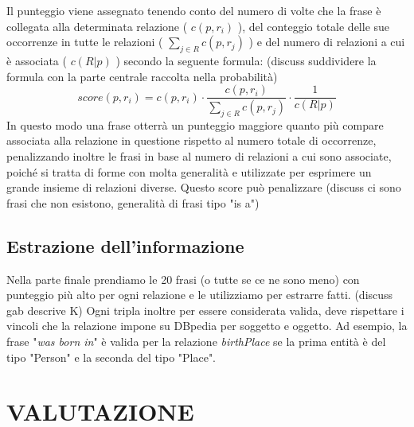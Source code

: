 \documentclass[10pt,a4paper,twocolumn]{article}
\begin{document}
Il punteggio viene assegnato tenendo conto del numero di volte che la frase è collegata alla determinata relazione ( $c(p,r_i)$ ), del conteggio totale delle sue occorrenze in tutte le relazioni ( $\sum_{j \in R} c(p,r_j)$ ) e del numero di relazioni a cui è associata ( $c(R|p)$ ) secondo la seguente formula: (discuss suddividere la formula con la parte centrale raccolta nella probabilità)
\[score(p,r_i)=c(p,r_i)\cdot\frac{c(p,r_i)}{\sum_{j \in R}c(p,r_j)}\cdot \frac{1}{c(R|p)} \]
In questo modo una frase otterrà un punteggio maggiore quanto più compare associata alla relazione in questione rispetto al numero totale di occorrenze, penalizzando inoltre le frasi in base al numero di relazioni a cui sono associate, poiché si tratta di forme con molta generalità e utilizzate per esprimere un grande insieme di relazioni diverse. Questo score può penalizzare (discuss ci sono frasi che non esistono, generalità di frasi tipo "is a")

\subsection{Estrazione dell'informazione}

Nella parte finale prendiamo le 20 frasi (o tutte se ce ne sono meno) con punteggio più alto per ogni relazione e le utilizziamo per estrarre fatti. (discuss gab descrive K) Ogni tripla inoltre per essere considerata valida, deve rispettare i vincoli che la relazione impone su DBpedia per soggetto e oggetto. Ad esempio, la frase "\textit{was born in}" è valida per la relazione \textit{birthPlace} se la prima entità è del tipo "Person" e la seconda del tipo "Place".

\section{VALUTAZIONE}
\end{document}
